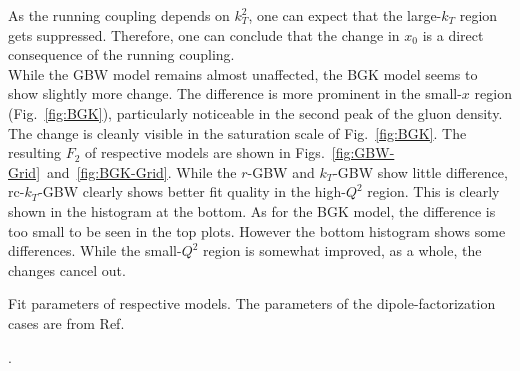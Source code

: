 \documentclass[12pt]{article}
\numberwithin{equation}{section}
\numberwithin{table}{section}
\numberwithin{figure}{section}
\begin{document}
As the running coupling depends on $k_T^2$,  one can expect that the large-$k_T$ region gets suppressed.  Therefore, one can conclude that the change in $x_0$ is a direct consequence of the running coupling.\\
While the GBW model remains almost unaffected, the BGK model seems to show slightly more change. The difference is more prominent in the small-$x$ region (Fig.~\ref{fig:BGK}), particularly noticeable in the second peak of the gluon density.
The change is cleanly visible in the saturation scale of Fig.~\ref{fig:BGK}. 
The resulting $F_2$ of respective models are shown in Figs.~\ref{fig:GBW-Grid}~and~\ref{fig:BGK-Grid}.
While the $r$-GBW and $k_T$-GBW show little difference, rc-$k_T$-GBW clearly shows better fit quality in the high-$Q^2$ region. This is clearly shown in the histogram at the bottom. 
As for the BGK model, the difference is too small to be seen in the top plots. However the bottom histogram shows some differences. While the small-$Q^2$ region is somewhat improved, as a whole, the changes cancel out. 


\begin{table}[t]
\begin{subtable}{\textwidth}
\center\footnotesize

\vspace{2mm}
\end{subtable}
\begin{subtable}{\textwidth}
\center\footnotesize

\vspace{2mm}
\end{subtable}
\caption{Fit parameters of respective models. The parameters of the dipole-factorization cases are from Ref.~\cite{Goda:2022wsc}}.
\label{tab:table}
\end{table}
\end{document}
